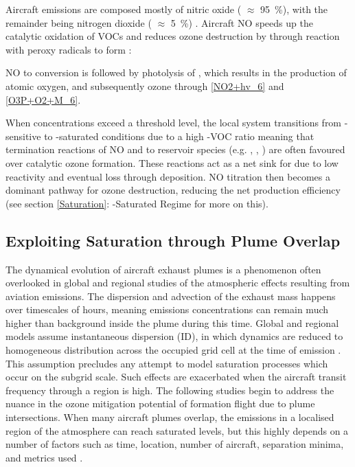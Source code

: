 
Aircraft  emissions are composed mostly of nitric oxide ( $\approx$ 95~\%), with the remainder being nitrogen dioxide ( $\approx$ 5~\%) \cite{Klemm1998}. Aircraft NO speeds up the catalytic oxidation of VOCs and reduces ozone destruction by  through reaction with peroxy radicals to form :


NO to  conversion is followed by photolysis of , which results in the production of atomic oxygen, and subsequently ozone \cite{Fittschen2019} through \eqref{NO2+hv_6} and \eqref{O3P+O2+M_6}.


When  concentrations exceed a threshold level, the local system transitions from -sensitive to -saturated conditions due to a high -VOC ratio meaning that termination reactions of NO and  to reservoir species (e.g. , , ) are often favoured over catalytic ozone formation. These reactions act as a net sink for  due to low reactivity and eventual loss through deposition. NO titration then becomes a dominant pathway for ozone destruction, reducing the net  production efficiency (see section \ref{Saturation}: -Saturated Regime for more on this). 


\subsection{Exploiting \texorpdfstring{}{NOx} Saturation through Plume Overlap}
The dynamical evolution of aircraft exhaust plumes is a phenomenon often overlooked in global and regional studies of the atmospheric effects resulting from aviation emissions. The dispersion and advection of the exhaust mass happens over timescales of hours, meaning emissions concentrations can remain much higher than background inside the plume during this time. Global and regional models assume instantaneous dispersion (ID), in which dynamics are reduced to homogeneous distribution across the occupied grid cell at the time of emission \cite{Paoli2011}. This assumption precludes any attempt to model saturation processes which occur on the subgrid scale. Such effects are exacerbated when the aircraft transit frequency through a region is high. The following studies begin to address the nuance in the ozone mitigation potential of formation flight due to plume intersections. When many aircraft plumes overlap, the  emissions in a localised region of the atmosphere can reach saturated levels, but this highly depends on a number of factors such as time, location, number of aircraft, separation minima, and metrics used \cite{Derwent2024}.

